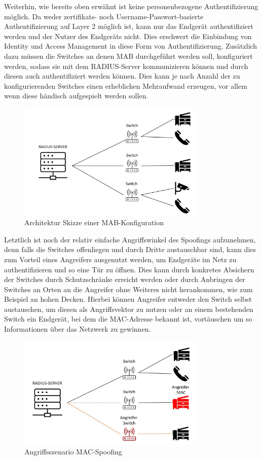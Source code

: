 \documentclass[conference]{IEEEtran}
\begin{document}
Weiterhin, wie bereits oben erwähnt ist keine personenbezogene Authentifizierung möglich. Da weder zertifikats- noch Username-Passwort-basierte Authentifizierung auf Layer 2 möglich ist, kann nur das Endgerät authentifiziert werden und der Nutzer des Endgeräts nicht. Dies erschwert die Einbindung von Identity und Access Management in diese Form von Authentifizierung. Zusätzlich dazu müssen die Switches an denen MAB durchgeführt werden soll, konfiguriert werden, sodass sie mit dem RADIUS-Server kommunizieren können und durch diesen auch authentifiziert werden können. Dies kann je nach Anzahl der zu konfigurierenden Switches einen erheblichen Mehraufwand erzeugen, vor allem wenn diese händisch aufgespielt werden sollen.\\

\begin{figure}[hbt]
	\centering
	\includegraphics[width=9cm]{figures/Server_Switch.jpg}
	\caption{Architektur Skizze einer MAB-Konfiguration}
	\label{fig:mab_configuration}
\end{figure}

Letztlich ist noch der relativ einfache Angriffswinkel des Spoofings aufzunehmen, denn falls die Switches offenliegen und durch Dritte austauschbar sind, kann dies zum Vorteil eines Angreifers ausgenutzt werden, um Endgeräte im Netz zu authentifizieren und so eine Tür zu öffnen. Dies kann durch konkretes Absichern der Switches durch Schutzschränke erreicht werden oder durch Anbringen der Switches an Orten an die Angreifer ohne Weiteres nicht herankommen, wie zum Beispiel an hohen Decken. Hierbei können Angreifer entweder den Switch selbst austauschen, um diesen als Angriffsvektor zu nutzen oder an einem bestehenden Switch ein Endgerät, bei dem die MAC-Adresse bekannt ist, vortäuschen um so Informationen über das Netzwerk zu gewinnen.\\

\begin{figure}[hbt]
	\centering
	\includegraphics[width=9cm]{figures/Angriffsszenario_Spoofing.jpg}
	\caption{Angriffsszenario MAC-Spoofing}
	\label{fig:mac_spoofing}
\end{figure}
\end{document}
